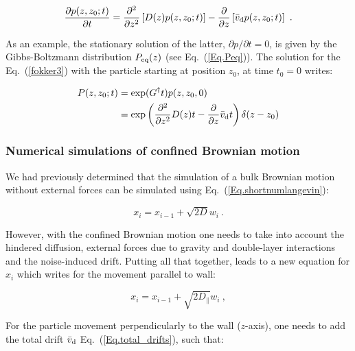 \begin{equation}
	\frac{\partial p(z, z_0 ; t)}{\partial t} = \frac{\partial ^2}{\partial z ^2} \left[ D(z)  p(z, z_0 ; t) \right]   -  \frac{\partial }{\partial z} \left[\bar{v}_\textnormal{d} p(z, z_0 ; t)\right] ~.
\end{equation}

As an example, the stationary solution of the latter, $\partial p / \partial t = 0$, is given by the Gibbs-Boltzmann distribution $P_\textnormal{eq}(z) $ (see Eq.~(\ref{Eq.Peq})). The solution for the Eq.~(\ref{fokker3}) with the particle starting at position $z_0$, at time $t_0 = 0$ writes:

\begin{equation}
	\begin{aligned}
		P(z, z_0; t) &= \exp (G^\dagger t) p(z, z_0, 0) \\
		& = \exp \left( \frac{\partial ^2}{\partial z ^2}  D(z)  t   -  \frac{\partial }{\partial z} \bar{v}_\textnormal{d} t\right) \delta (z - z_0)
	\end{aligned}
	\label{Eq.solfokker}
\end{equation} 

\subsubsection{Numerical simulations of confined Brownian motion}

We had previously determined that the simulation of a bulk Brownian motion without external forces can be simulated using Eq.~(\ref{Eq.shortnumlangevin}): 

\begin{equation}
	x_i = x_{i-1} + \sqrt{2D}w_i~.
\end{equation}

However, with the confined Brownian motion one needs to take into account the hindered diffusion, external forces due to gravity and double-layer interactions and the noise-induced drift. Putting all that together, leads to a new equation for $x_i$ which writes for the movement parallel to wall:

\begin{equation}
	x_i = x_{i-1} +  \sqrt{2D_\parallel}w_i ~,
\end{equation}

For the particle movement perpendicularly to the wall ($z$-axis), one needs to add the total drift $\bar{v}_\textnormal{d}$ Eq.~(\ref{Eq.total_drifts}), such that:

